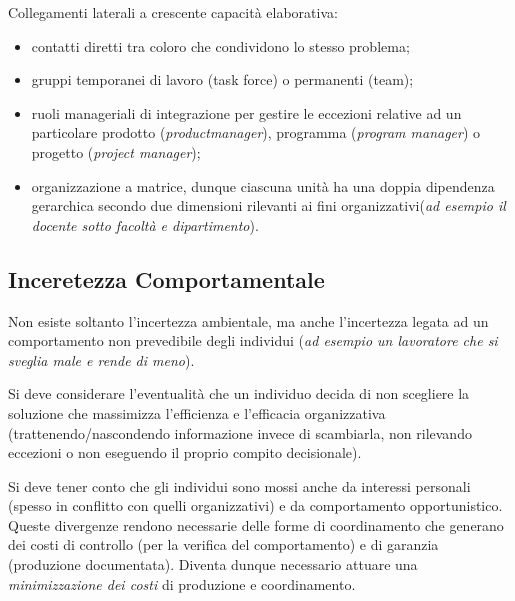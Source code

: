 \documentclass[a4paper, notitlepage, 9pt]{extreport}
\begin{document}
\noindent
Collegamenti laterali a crescente capacità elaborativa:
\begin{itemize}
	\item contatti diretti tra coloro che condividono lo stesso problema;
	\item gruppi temporanei di lavoro (task force) o permanenti (team);
	\item ruoli manageriali di integrazione per gestire le eccezioni relative ad un particolare prodotto (\textit{\small{productmanager}}), programma (\textit{\small{program manager}}) o progetto (\textit{\small{project manager}});
	\item organizzazione a matrice, dunque ciascuna unità ha una doppia dipendenza gerarchica secondo due dimensioni rilevanti ai fini organizzativi(\textit{\small{ad esempio il docente sotto facoltà e dipartimento}}).
\end{itemize}

\subsection*{Inceretezza Comportamentale}
Non esiste soltanto l’incertezza ambientale, ma anche l’incertezza legata ad un comportamento non prevedibile degli individui (\textit{\small{ad esempio un lavoratore che si sveglia male e rende di meno}}).

Si deve considerare l’eventualità che un individuo
decida di non scegliere la soluzione che massimizza l’efficienza e l’efficacia organizzativa (\small{trattenendo/nascondendo informazione invece di scambiarla, non rilevando eccezioni o non eseguendo il proprio compito decisionale}).

Si deve tener conto che gli individui sono mossi anche da interessi personali (spesso in conflitto con quelli organizzativi) e da comportamento opportunistico.
Queste divergenze rendono necessarie delle forme di coordinamento che generano dei costi di controllo (per la verifica del comportamento) e di garanzia (produzione documentata). Diventa dunque necessario attuare una \textit{minimizzazione dei costi} di produzione e coordinamento.
\end{document}
